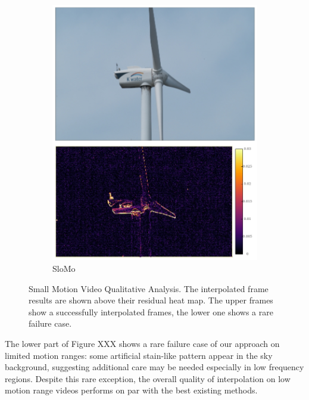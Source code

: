 \documentclass{article}
\begin{document}
\begin{figure}[h]
\begin{subfigure}{0.14\textwidth}
    \includegraphics[width=1\linewidth]{qua_imgs/TEST02_045_f0465_super.jpg}
    \caption{SloMo}
\end{subfigure}
\caption{
Small Motion Video Qualitative Analysis.
The interpolated frame results are shown above their residual heat map.
The upper frames show a successfully interpolated frames,
the lower one shows a rare failure case.}
\end{figure}

The lower part of Figure XXX shows a rare failure case of our approach on limited motion ranges:
some artificial stain-like pattern appear in the sky background,
suggesting additional care may be needed especially in low frequency regions.
Despite this rare exception, the overall quality of interpolation
on low motion range videos performs on par with the best existing methods.
\end{document}
